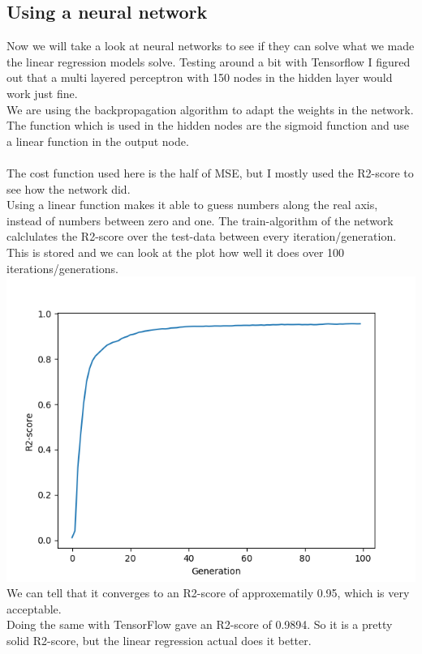 \documentclass[a4paper,norsk]{article}
\begin{document}
\subsection{Using a neural network}
Now we will take a look at neural networks to see if they can solve what we made the linear regression models solve. Testing around a bit with Tensorflow I figured out that a multi layered perceptron with 150 nodes in the hidden layer would work just fine.\\
We are using the backpropagation algorithm to adapt the weights in the network.\\
The function which is used in the hidden nodes are the sigmoid function and use a linear function in the output node.\\
\\The cost function used here is the half of MSE, but I mostly used the R2-score to see how the network did.\\
Using a linear function makes it able to guess numbers along the real axis, instead of numbers between zero and one.
The train-algorithm of the network calclulates the R2-score over the test-data between every iteration/generation. This is stored and we can look at the plot how well it does over 100 iterations/generations.\\
\includegraphics[scale=.7]{images/linearNN}\\
We can tell that it converges to an R2-score of approxematily 0.95, which is very acceptable.\\
Doing the same with TensorFlow gave an R2-score of 0.9894. So it is a pretty solid R2-score, but the linear regression actual does it better.\\
\end{document}
